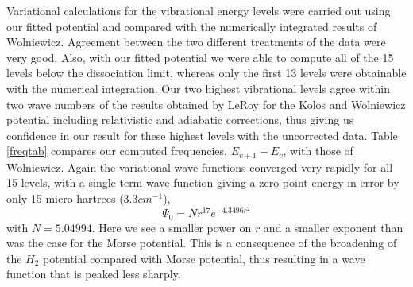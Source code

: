 \documentclass[12pt,thmsa]{article}
\begin{document}
Variational calculations for the vibrational energy levels were carried out
using our fitted potential and compared with the numerically integrated
results of Wolniewicz\cite{Wolniewicz66}. Agreement between the two
different treatments of the data were very good. Also, with our fitted
potential we were able to compute all of the 15 levels below the
dissociation limit, whereas only the first 13 levels were obtainable with
the numerical integration. Our two highest vibrational levels agree within
two wave numbers of the results obtained by LeRoy\cite{LeRoy68} for the
Kolos and Wolniewicz potential including relativistic and adiabatic
corrections, thus giving us confidence in our result for these highest
levels with the uncorrected data. Table \ref{freqtab} compares our computed
frequencies, $E_{v+1}-E_v$, with those of Wolniewicz\cite{Wolniewicz66}.
Again the variational wave functions converged very rapidly for all 15
levels, with a single term wave function giving a zero point energy in error
by only 15 micro-hartrees (3.3$cm^{-1}$), 
\begin{equation}
\Psi _0=Nr^{17}e^{-4.3496r^2}
\end{equation}
with $N=5.04994$. Here we see a smaller power on $r$ and a smaller exponent
than was the case for the Morse potential. This is a consequence of the
broadening of the $H_2$ potential compared with Morse potential, thus
resulting in a wave function that is peaked less sharply.
\end{document}
